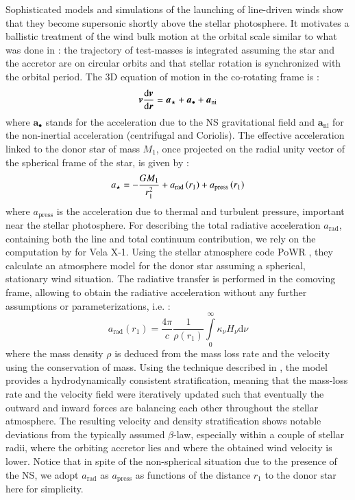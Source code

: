 \documentclass{aa}
\makeatletter
\newcommand*{\ns}{NS\@\xspace}
\newcommand*\diff{\mathop{}\!\mathrm{d}}
\newcommand{\mystar}{{\fontfamily{lmr}\selectfont$\star$}}
\makeatother
\begin{document}
Sophisticated models and simulations of the launching of line-driven winds show that they become supersonic shortly above the stellar photosphere. It motivates a ballistic treatment of the wind bulk motion at the orbital scale similar to what was done in \cite{ElMellah2016} : the trajectory of test-masses is integrated assuming the star and the accretor are on circular orbits and that stellar rotation is synchronized with the orbital period. The 3D equation of motion in the co-rotating frame is :
\begin{equation}
\label{eq:ball}
\boldsymbol{v}\frac{\diff \boldsymbol{v}}{\diff \boldsymbol{r}} = \boldsymbol{a}_{\text{\mystar}} + \boldsymbol{a}_{\bullet} + \boldsymbol{a}_{\text{ni}}
\end{equation}
where $\boldsymbol{a}_{\bullet}$ stands for the acceleration due to the \ns gravitational field and $\boldsymbol{a}_{\text{ni}}$ for the non-inertial acceleration (centrifugal and Coriolis). The effective acceleration linked to the donor star of mass $M_1$, once projected on the radial unity vector of the spherical frame of the star, is given by :
\begin{equation}
a_{\text{\mystar}}=-\frac{GM_1}{r_1^2}+a_{\text{rad}}\left(r_1\right)+a_{\text{press}}\left(r_1\right)
\end{equation}
where $a_{\text{press}}$ is the acceleration due to thermal and turbulent pressure, important near the stellar photosphere. For describing the total radiative acceleration $a_{\text{rad}}$, containing both the line and total continuum contribution, we rely on the computation by \cite{Sander2017} for Vela X-1. Using the stellar atmosphere code PoWR \citep[e.g.]{Hamann1998,Grafener2002}, they calculate an atmosphere model for the donor star assuming a spherical, stationary wind situation. The radiative transfer is performed in the comoving frame, allowing to obtain the radiative acceleration without any further assumptions or parameterizations, i.e. :
\begin{equation}
\label{eq:araddef}
a_{\text{rad}}\left(r_1\right)  = \frac{4\pi}{c} \frac{1}{\rho(r_1)}  \int\limits_{0}^{\infty} \kappa_\nu H_\nu \mathrm{d}\nu 
\end{equation}
where the mass density $\rho$ is deduced from the mass loss rate and the velocity using the conservation of mass. Using the technique described in \cite{Sander2017b}, the model provides a hydrodynamically consistent stratification, meaning that the mass-loss rate and the velocity field were iteratively updated such that eventually the outward and inward forces are balancing each other throughout the stellar atmosphere. The resulting velocity and density stratification shows notable deviations from the typically assumed $\beta$-law, especially within a couple of stellar radii, where the orbiting accretor lies and where the obtained wind velocity is lower. Notice that in spite of the non-spherical situation due to the presence of the \ns, we adopt $a_\text{rad}$ as $a_\text{press}$ as functions of the distance $r_1$ to the donor star here for simplicity.
\end{document}
